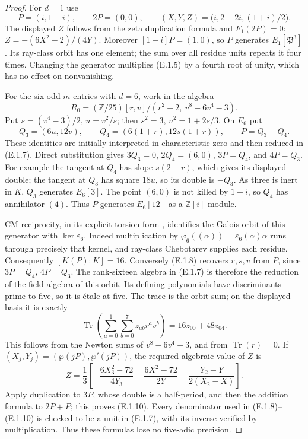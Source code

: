 \begin{proof}
For \(d=1\) use
\[
 P=(i,1-i),\qquad 2P=(0,0),\qquad
 (X,Y,Z)=\bigl(i,2-2i,(1+i)/2\bigr).                    \tag{E.1.6}
\]
The displayed \(Z\) follows from the zeta duplication formula
and \(F_1(2P)=0\): \(Z=-(6X^2-2)/(4Y)\).
Moreover \([1+i]P=(1,0)\), so \(P\) generates
\(E_1[\mathfrak P^3]\). Its ray-class orbit has one element;
the sum over all residue units repeats it four times.
Changing the generator multiplies (E.1.5) by a fourth root
of unity, which has no effect on nonvanishing.

For the six odd-\(m\) entries with \(d=6\), work in the
algebra
\[
 R_0=(\mathbb Z/25)[r,v]/(r^2-2,\ v^8-6v^4-3).
                                                               \tag{E.1.7}
\]
Put \(s=(v^4-3)/2\), \(u=v^2/s\); then
\(s^2=3\), \(u^2=1+2s/3\). On \(E_6\) put
\[
 Q_3=(6u,12v),\qquad Q_4=(6(1+r),12s(1+r)),
 \qquad P=Q_3-Q_4.                                      \tag{E.1.8}
\]
These identities are initially interpreted in characteristic
zero and then reduced in (E.1.7). Direct substitution gives
\(3Q_3=0\), \(2Q_4=(6,0)\), \(3P=Q_4\), and \(4P=Q_3\).
For example the tangent at \(Q_4\) has slope \(s(2+r)\),
which gives its displayed double; the tangent at \(Q_3\)
has square \(18u\), so its double is \(-Q_3\).
As three is inert in \(K\), \(Q_3\) generates \(E_6[3]\).
The point \((6,0)\) is not killed by \(1+i\), so \(Q_4\)
has annihilator \((4)\). Thus \(P\) generates \(E_6[12]\)
as a \(\mathbb Z[i]\)-module.

CM reciprocity, in its explicit torsion form
\cite[Theorem 5.15 and Corollary 5.16]{DE_RubinAWS1999},
identifies the Galois orbit of this generator with
\(\ker\varepsilon_6\). Indeed multiplication by
\(\varphi_6((\alpha))=\varepsilon_6(\alpha)\alpha\)
runs through precisely that kernel, and ray-class
Chebotarev supplies each residue. Consequently
\([K(P):K]=16\). Conversely (E.1.8) recovers \(r,s,v\)
from \(P\), since \(3P=Q_4\), \(4P=Q_3\).
The rank-sixteen algebra in (E.1.7) is therefore the
reduction of the field algebra of this orbit. Its defining
polynomials have discriminants prime to five, so it is
\'etale at five. The trace is the orbit sum; on the displayed
basis it is exactly
\[
 \operatorname{Tr}\!\left(\sum_{a=0}^1\sum_{b=0}^7
                 z_{ab}r^av^b\right)=16z_{00}+48z_{04}. \tag{E.1.9}
\]
This follows from the Newton sums of \(v^8-6v^4-3\),
and from \(\operatorname{Tr}(r)=0\).
If \((X_j,Y_j)=(\wp(jP),\wp'(jP))\), the required
algebraic value of \(Z\) is
\[
 Z=\frac13\left[-\frac{6X_3^2-72}{4Y_3}
 -\frac{6X^2-72}{2Y}
 -\frac{Y_2-Y}{2(X_2-X)}\right].                        \tag{E.1.10}
\]
Apply duplication to \(3P\), whose double is a half-period,
and then the addition formula to \(2P+P\); this proves
(E.1.10). Every denominator used in (E.1.8)--(E.1.10)
is checked to be a unit in (E.1.7), with its inverse
verified by multiplication. Thus these formulas lose no
five-adic precision.


\end{proof}
